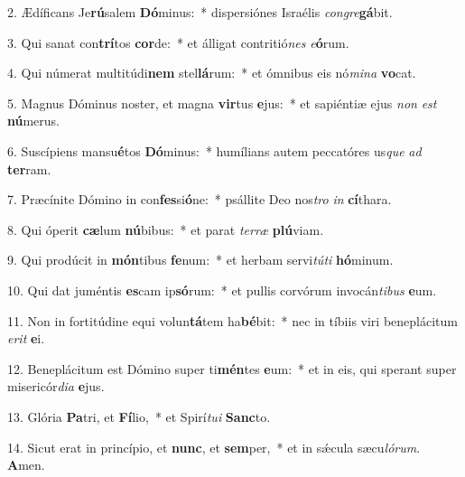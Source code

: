 2. Ædíficans Je\textbf{rú}salem \textbf{Dó}minus:~*  dispersiónes Israélis \textit{con}\textit{gre}\textbf{gá}bit.\

3. Qui sanat con\textbf{trí}tos \textbf{cor}de:~*  et álligat contritió\textit{nes} \textit{e}\textbf{ó}rum.\

4. Qui númerat multitúdi\textbf{nem} stel\textbf{lá}rum:~*  et ómnibus eis nó\textit{mi}\textit{na} \textbf{vo}cat.\

5. Magnus Dóminus noster, et magna \textbf{vir}tus \textbf{e}jus:~*  et sapiéntiæ ejus \textit{non} \textit{est} \textbf{nú}merus.\

6. Suscípiens mansu\textbf{é}tos \textbf{Dó}minus:~*  humílians autem peccatóres us\textit{que} \textit{ad} \textbf{ter}ram.\

7. Præcínite Dómino in con\textbf{fes}si\textbf{ó}ne:~*  psállite Deo nos\textit{tro} \textit{in} \textbf{cí}thara.\

8. Qui óperit \textbf{cæ}lum \textbf{nú}bibus:~*  et parat \textit{ter}\textit{ræ} \textbf{plú}viam.\

9. Qui prodúcit in \textbf{món}tibus \textbf{fe}num:~*  et herbam servi\textit{tú}\textit{ti} \textbf{hó}minum.\

10. Qui dat juméntis \textbf{es}cam ip\textbf{só}rum:~*  et pullis corvórum invocán\textit{ti}\textit{bus} \textbf{e}um.\

11. Non in fortitúdine equi volun\textbf{tá}tem ha\textbf{bé}bit:~*  nec in tíbiis viri beneplácitum \textit{e}\textit{rit} \textbf{e}i.\

12. Beneplácitum est Dómino super ti\textbf{mén}tes \textbf{e}um:~*  et in eis, qui sperant super misericór\textit{di}\textit{a} \textbf{e}jus.\

13. Glória \textbf{Pa}tri, et \textbf{Fí}lio,~*  et Spirí\textit{tu}\textit{i} \textbf{Sanc}to.\

14. Sicut erat in princípio, et \textbf{nunc}, et \textbf{sem}per,~*  et in sǽcula sæcu\textit{ló}\textit{rum}. \textbf{A}men.\

